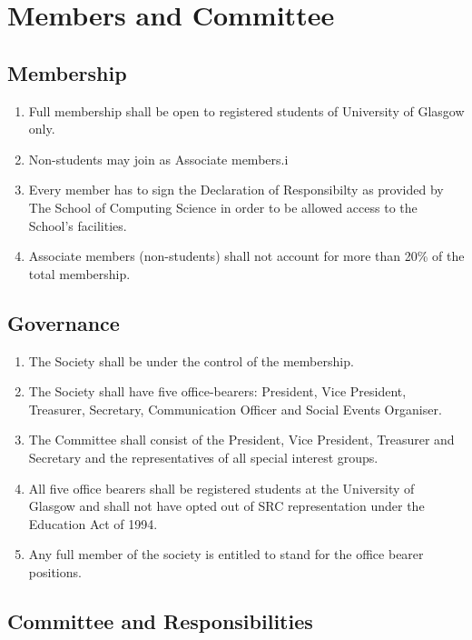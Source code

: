 \documentclass{report}
\newcommand{\bearersNo}{five}
\begin{document}
\chapter{Members and Committee}

\section{Membership}

	\begin{enumerate}
		\item{Full membership shall be open to registered students of University of Glasgow only.}
		\item{Non-students may join as Associate members.}i
		\item{Every member has to sign the Declaration of Responsibilty as provided by The School of Computing Science in order to be allowed access to the School's facilities.}
		\item{Associate members (non-students) shall not account for more than 20\% of the total membership.}
	\end{enumerate}

\section{Governance}

	\begin{enumerate}
		\item{The Society shall be under the control of the membership.}
		\item{The Society shall have \bearersNo{} office-bearers: President, Vice President, Treasurer, Secretary, Communication Officer and Social Events Organiser.}
		\item{The Committee shall consist of the President, Vice President, Treasurer and Secretary and the representatives of all special interest groups.}
		\item{All \bearersNo{} office bearers shall be registered students at the University of Glasgow and shall not have opted out of SRC representation under the Education Act of 1994.}
		\item{Any full member of the society is entitled to stand for the office bearer positions.}
	\end{enumerate}
	
\section{Committee and Responsibilities}
\end{document}
